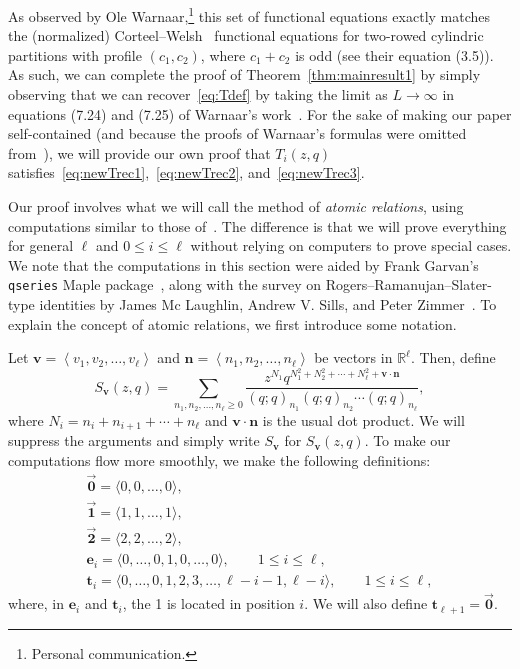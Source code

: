 \documentclass[10pt,a4paper]{amsart}
\numberwithin{equation}{section}
\theoremstyle{definition}
\newcommand{\RR}{\mathbb{R}}
\newcommand{\tr}{\mathbf{t}}
\newcommand{\nn}{\mathbf{n}}
\newcommand{\vv}{\mathbf{v}}
\newcommand{\ee}{\mathbf{e}}
\newcommand{\two}{\vec{\mathbf{2}}}
\newcommand{\one}{\vec{\mathbf{1}}}
\newcommand{\zero}{\vec{\mathbf{0}}}
\begin{document}
As observed by Ole Warnaar,\footnote{Personal communication.} this set of functional equations exactly matches the (normalized) Corteel--Welsh~\cite{CW} functional equations for two-rowed cylindric partitions with profile $(c_1,c_2)$, where $c_1+c_2$ is odd (see their equation (3.5)). As such, we can complete the proof of Theorem~\ref{thm:mainresult1} by simply observing that we can recover~\eqref{eq:Tdef} by taking the limit as $L\to\infty$ in equations (7.24) and (7.25) of Warnaar's work~\cite{WarnCyl}. For the sake of making our paper self-contained (and because the proofs of Warnaar's formulas were omitted from~\cite{WarnCyl}), we will provide our own proof that $T_i(z,q)$ satisfies~\eqref{eq:newTrec1},~\eqref{eq:newTrec2}, and~\eqref{eq:newTrec3}.

Our proof involves what we will call the method of {\it atomic relations}, using computations similar to those of~\cite{BKRS,KanRus-cylindric}. The difference is that we will prove everything for general $\ell$ and $0\le i \le \ell$ without relying on computers to prove special cases. We note that the computations in this section were aided by Frank Garvan's {\tt qseries} Maple package~\cite{Gar}, along with the survey on Rogers--Ramanujan--Slater-type identities by James Mc Laughlin, Andrew V. Sills, and Peter Zimmer~\cite{MSZ}. To explain the concept of atomic relations, we first introduce some notation.

Let $\vv = \left\langle v_1,v_2,\dots,v_{\ell}\right\rangle$ and $\nn = \left\langle n_1,n_2,\dots,n_{\ell}\right\rangle$ be vectors in $\RR^\ell$. Then, define
\begin{equation*}
S_\vv(z,q)=\sum_{n_1,n_2,\dots,n_{\ell}\ge 0} \frac{z^{N_1}q^{N_1^2+N_2^2+\cdots+N_{\ell}^2+\vv \cdot \nn}}{(q;q)_{n_1}(q;q)_{n_2}\cdots(q;q)_{n_{\ell}}},
\end{equation*}
where $N_i = n_i +n_{i+1}+\cdots+n_{\ell}$ and $\vv\cdot \nn$ is the usual dot product. We will suppress the arguments and simply write $S_\vv$ for $S_\vv(z,q)$. To make our computations flow more smoothly, we make the following definitions:
\begin{gather*}
\zero = \langle 0,0,\dots,0\rangle, \\
\one = \langle 1,1,\dots,1\rangle, \\
\two = \langle 2,2,\dots,2\rangle, \\
\ee_i = \langle 0, \dots, 0, 1, 0, \dots, 0 \rangle, \qquad 1 \le i \le \ell, \\
\tr_i = \langle 0, \dots, 0, 1, 2, 3, \dots, \ell-i-1, \ell-i \rangle, \qquad 1 \le i \le \ell,
\end{gather*}
where, in $\ee_i$ and $\tr_i$, the 1 is located in position $i$. We will also define $\tr_{\ell+1} = \zero$.
\end{document}
